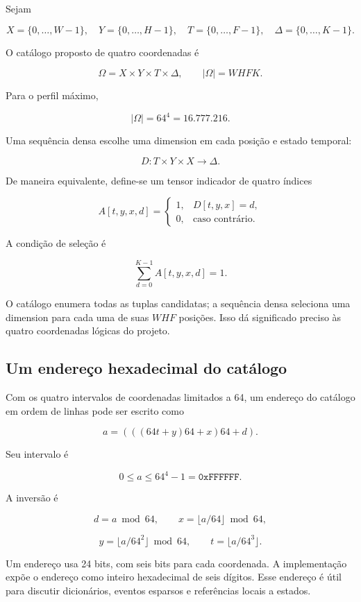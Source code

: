 \documentclass[
  11pt,
  a4paper,
]{article}
\begin{document}
Sejam

\[
X=\{0,\ldots,W-1\},\quad
Y=\{0,\ldots,H-1\},\quad
T=\{0,\ldots,F-1\},\quad
\Delta=\{0,\ldots,K-1\}.
\]

O catálogo proposto de quatro coordenadas é

\[
\Omega=X\times Y\times T\times\Delta,\qquad
|\Omega|=WHFK.
\]

Para o perfil máximo,

\[
|\Omega|=64^4=16.777.216.
\]

Uma sequência densa escolhe uma dimension em cada posição e estado
temporal:

\[
D:T\times Y\times X\longrightarrow\Delta.
\]

De maneira equivalente, define-se um tensor indicador de quatro índices

\[
A[t,y,x,d]=
\begin{cases}
1,&D[t,y,x]=d,\\
0,&\text{caso contrário}.
\end{cases}
\]

A condição de seleção é

\[
\sum_{d=0}^{K-1}A[t,y,x,d]=1.
\]

O catálogo enumera todas as tuplas candidatas; a sequência densa
seleciona uma dimension para cada uma de suas \(WHF\) posições. Isso dá
significado preciso às quatro coordenadas lógicas do projeto.

\hypertarget{um-endereuxe7o-hexadecimal-do-catuxe1logo}{%
\subsection{Um endereço hexadecimal do
catálogo}\label{um-endereuxe7o-hexadecimal-do-catuxe1logo}}

Com os quatro intervalos de coordenadas limitados a 64, um endereço do
catálogo em ordem de linhas pode ser escrito como

\[
a=(((64t+y)64+x)64+d).
\]

Seu intervalo é

\[
0\le a\le64^4-1=\mathtt{0xFFFFFF}.
\]

A inversão é

\[
d=a\bmod64,\qquad
x=\lfloor a/64\rfloor\bmod64,
\]

\[
y=\lfloor a/64^2\rfloor\bmod64,\qquad
t=\lfloor a/64^3\rfloor.
\]

Um endereço usa 24 bits, com seis bits para cada coordenada. A
implementação expõe o endereço como inteiro hexadecimal de seis dígitos.
Esse endereço é útil para discutir dicionários, eventos esparsos e
referências locais a estados.
\end{document}
